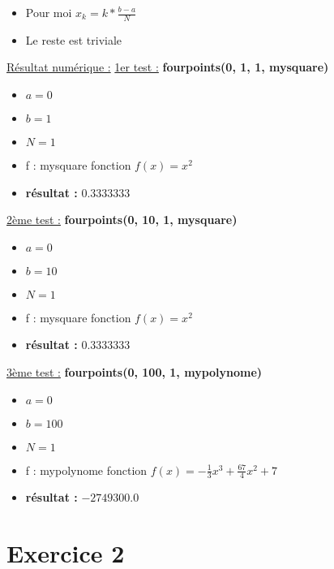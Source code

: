 \documentclass{article}
\begin{document}
\begin{enumerate}
  \begin{itemize}
  \item Pour moi $x_k = k * \frac{b - a}{N}$
  \item Le reste est triviale
  \end{itemize}

  \underline{Résultat numérique :} \newline\newline
  \underline{1er test :} \textbf{fourpoints(0, 1, 1, mysquare)}

  \begin{itemize}
  \item $ a = 0 $
  \item $ b = 1 $
  \item $ N = 1 $
  \item f : mysquare fonction $f(x) = x^2$
  \item \textbf{résultat :} $0.3333333$
  \end{itemize}

  \underline{2ème test :} \textbf{fourpoints(0, 10, 1, mysquare)}

  \begin{itemize}
  \item $ a = 0 $
  \item $ b = 10 $
  \item $ N = 1 $
  \item f : mysquare fonction $f(x) = x^2$
  \item \textbf{résultat :} $0.3333333$
  \end{itemize}

  \underline{3ème test :} \textbf{fourpoints(0, 100, 1, mypolynome)}

  \begin{itemize}
  \item $ a = 0 $
  \item $ b = 100 $
  \item $ N = 1 $
  \item f : mypolynome fonction $f(x) = - \frac{1}{3} x^3 +
    \frac{67}{4} x^2 + 7$
  \item \textbf{résultat :} $-2749300.0$
  \end{itemize}

\end{enumerate}

\section*{Exercice 2}
\end{document}
